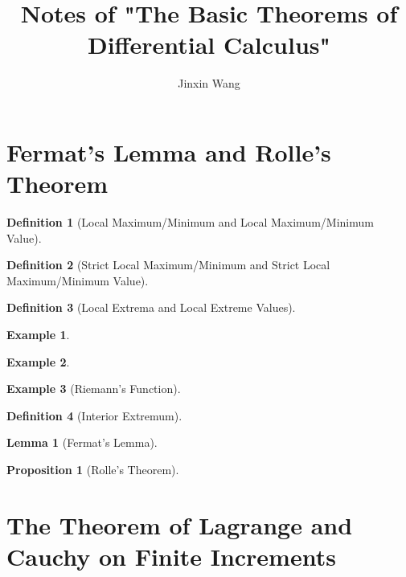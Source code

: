 \documentclass[onecolumn]{ctexart}
\title{Notes of "The Basic Theorems of Differential Calculus"}
\author{Jinxin Wang}
\date{}
\newtheorem{definition}{Definition}
\newtheorem{proposition}{Proposition}
\newtheorem{lemma}{Lemma}
\newtheorem{example}{Example}
\begin{document}
\maketitle

\section{Fermat's Lemma and Rolle's Theorem}

\begin{definition}[Local Maximum/Minimum and Local Maximum/Minimum Value]
  
\end{definition}

\begin{definition}[Strict Local Maximum/Minimum and Strict Local Maximum/Minimum Value]
  
\end{definition}

\begin{definition}[Local Extrema and Local Extreme Values]
  
\end{definition}

\begin{example}
  
\end{example}

\begin{example}
  
\end{example}

\begin{example}[Riemann's Function]
  
\end{example}

\begin{definition}[Interior Extremum]
  
\end{definition}

\begin{lemma}[Fermat's Lemma]
  
\end{lemma}

\begin{proposition}[Rolle's Theorem]
  
\end{proposition}

\section{The Theorem of Lagrange and Cauchy on Finite Increments}
\end{document}
